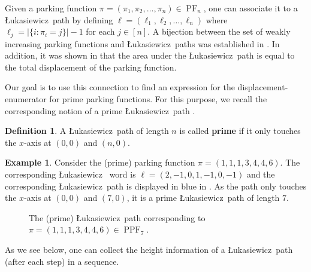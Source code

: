 \documentclass[12pt,reqno]{amsart}
\theoremstyle{definition}
\newtheorem{definition}{Definition}
\newtheorem{example}{Example}
\theoremstyle{remark}
\newcommand{\x}{\textbf{x}}
\DeclareMathOperator{\PF}{PF}
\DeclareMathOperator{\PPF}{PPF}
\newcommand{\Luka}{\L ukasiewicz}
\newcommand{\defterm}{\textbf}
\begin{document}
Given a parking function $\pi=(\pi_1,\pi_2,\ldots, \pi_n)\in \PF_n$, one can associate it to a \Luka~path by defining $\ell=(\ell_1,\ell_2,\ldots,\ell_n)$ where $\ell_j= | \{ i : \pi_i=j\}|-1$ for each $j\in [n]$.  A bijection between the set of 
weakly increasing parking functions and 
\Luka~paths was established in \cite{SZ}. In addition, it was shown in \cite[Theorem 2.1]{SZ} that the area under the \Luka~path is equal to the total displacement of the parking function.



Our goal is to use this connection to find an expression for the displacement-enumerator for prime parking functions. For this purpose, we recall the corresponding notion of a prime \Luka~path \cite{SZ}.

\begin{definition}
    A \Luka~path of length $n$ 
    is called \defterm{prime} if it only touches the $x$-axis at $(0,0)$ and $(n,0)$.
\end{definition}


\begin{example} 
\label{ex:L-path}
Consider the (prime) parking function $\pi=(1,1,1,3,4,4,6)$. The corresponding \Luka~ word is  $\ell=(2,-1,0,1,-1,0,-1)$ and the corresponding  \Luka~path is displayed in blue 
in .  As the path only touches the $x$-axis
 at $(0,0)$ and $(7,0)$, it is a prime \Luka~path of length $7$. 
 \begin{figure}[H]
    \centering
    \caption{The (prime) \Luka~path corresponding to $\pi = (1,1,1,3,4,4,6) \in \PPF_7$.}
    \label{fig:Lukapath}
\end{figure}
\end{example}


As we see below, one can collect the height information of a \Luka~path (after each step) in a sequence.  
\end{document}
